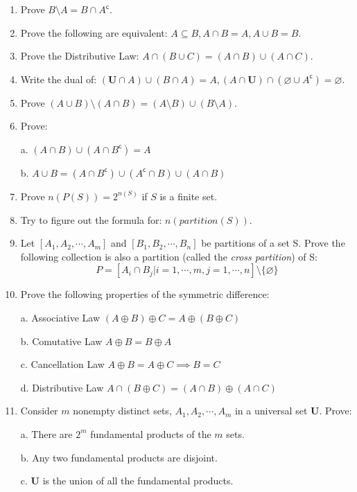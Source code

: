 \documentclass{article}
\newcommand{\setcomp}[1] {{#1}^{\mathsf{c}}}
\begin{document}
\begin{enumerate}
  \item Prove $B\setminus A = B\cap \setcomp{A}$.
  \item Prove the following are equivalent:
  $A\subseteq B, A \cap B = A, A\cup B = B$.

  \item Prove the Distributive Law:
  $A\cap(B\cup C) = (A\cap B)\cup (A\cap C)$.

  \item Write the dual of:
  $
  (\textbf{U} \cap A)\cup (B\cap A) = A,
  (A\cap \textbf{U})\cap (\varnothing \cup \setcomp{A}) = \varnothing
  $.

  \item Prove $(A\cup B)\setminus (A\cap B) = (A\setminus B)\cup (B\setminus A)$.

  \item Prove:

    a. $(A\cap B)\cup (A\cap \setcomp{B}) = A$

    b. $A\cup B = (A\cap \setcomp{B})\cup (\setcomp{A}\cap B)\cup (A\cap B)$

  \item Prove $n(P(S)) = 2^{n(S)}$ if $S$ is a finite set.

  \item Try to figure out the formula for: $n(partition(S))$.

  \item Let $[A_1, A_2, \cdots, A_m]$ and $[B_1, B_2, \cdots, B_n]$ be partitions of a set S.
  Prove the following collection is also a partition (called the \textsl{cross partition}) of S:
  $$
  P = [A_i\cap B_j | i = 1, \cdots, m, j = 1, \cdots, n]\setminus \{\varnothing\}
  $$

  \item Prove the following properties of the symmetric difference:

    a. Associative Law $(A\oplus B)\oplus C = A\oplus(B \oplus C)$

    b. Comutative Law $A\oplus B = B\oplus A$

    c. Cancellation Law $A\oplus B = A\oplus C \implies B = C$

    d. Distributive Law $A\cap (B\oplus C) = (A\cap B)\oplus (A\cap C)$

  \item Consider $m$ nonempty distinct sets, $A_1, A_2, \cdots, A_m$ in a universal set $\textbf{U}$. Prove:

    a. There are $2^m$ fundamental products of the $m$ sets.

    b. Any two fundamental products are disjoint.

    c. $\textbf{U}$ is the union of all the fundamental products.

\end{enumerate}
\end{document}
